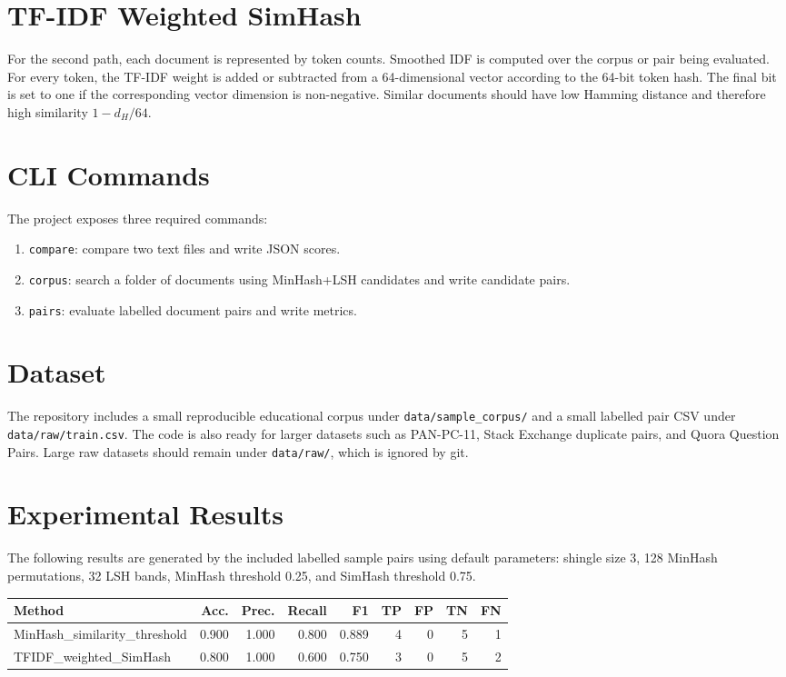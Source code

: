 \documentclass[11pt,a4paper]{article}
\begin{document}
\section{TF-IDF Weighted SimHash}
For the second path, each document is represented by token counts. Smoothed IDF is computed over the corpus or pair being evaluated. For every token, the TF-IDF weight is added or subtracted from a 64-dimensional vector according to the 64-bit token hash. The final bit is set to one if the corresponding vector dimension is non-negative. Similar documents should have low Hamming distance and therefore high similarity $1 - d_H/64$.

\section{CLI Commands}
The project exposes three required commands:
\begin{enumerate}[label=\arabic*.]
  \item \texttt{compare}: compare two text files and write JSON scores.
  \item \texttt{corpus}: search a folder of documents using MinHash+LSH candidates and write candidate pairs.
  \item \texttt{pairs}: evaluate labelled document pairs and write metrics.
\end{enumerate}

\section{Dataset}
The repository includes a small reproducible educational corpus under \texttt{data/sample\_corpus/} and a small labelled pair CSV under \texttt{data/raw/train.csv}. The code is also ready for larger datasets such as PAN-PC-11, Stack Exchange duplicate pairs, and Quora Question Pairs. Large raw datasets should remain under \texttt{data/raw/}, which is ignored by git.

\section{Experimental Results}
The following results are generated by the included labelled sample pairs using default parameters: shingle size 3, 128 MinHash permutations, 32 LSH bands, MinHash threshold 0.25, and SimHash threshold 0.75.

\begin{center}
\begin{tabular}{lrrrrrrrr}
\toprule
Method & Acc. & Prec. & Recall & F1 & TP & FP & TN & FN \\
\midrule
MinHash\_similarity\_threshold & 0.900 & 1.000 & 0.800 & 0.889 & 4 & 0 & 5 & 1 \\
TFIDF\_weighted\_SimHash & 0.800 & 1.000 & 0.600 & 0.750 & 3 & 0 & 5 & 2 \\
\bottomrule
\end{tabular}
\end{center}
\end{document}
